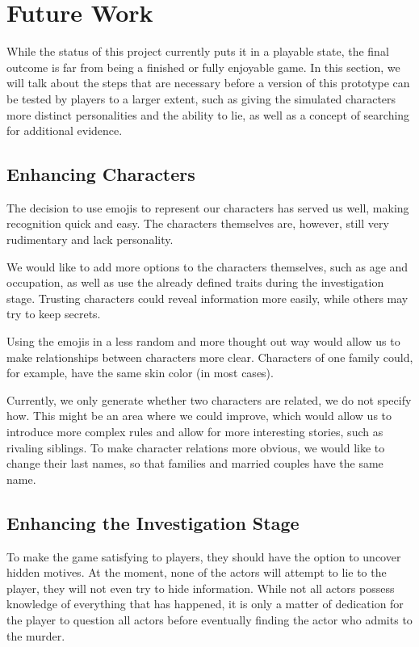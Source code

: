 \section{Future Work} \label{future_work}

While the status of this project currently puts it in a playable state, the final outcome is far from being a finished or fully enjoyable game.
In this section, we will talk about the steps that are necessary before a version of this prototype can be tested by players to a larger extent, such as giving the simulated characters more distinct personalities and the ability to lie, as well as a concept of searching for additional evidence.

\subsection{Enhancing Characters}

The decision to use emojis to represent our characters has served us well, making recognition quick and easy.
The characters themselves are, however, still very rudimentary and lack personality.

We would like to add more options to the characters themselves, such as age and occupation, as well as use the already defined traits during the investigation stage. Trusting characters could reveal information more easily, while others may try to keep secrets.

Using the emojis in a less random and more thought out way would allow us to make relationships between characters more clear. Characters of one family could, for example, have the same skin color (in most cases).

Currently, we only generate whether two characters are related, we do not specify how.
This might be an area where we could improve, which would allow us to introduce more complex rules and allow for more interesting stories, such as rivaling siblings. To make character relations more obvious, we would like to change their last names, so that families and married couples have the same name.

\subsection{Enhancing the Investigation Stage}
To make the game satisfying to players, they should have the option to uncover hidden motives.
At the moment, none of the actors will attempt to lie to the player, they will not even try to hide information.
While not all actors possess knowledge of everything that has happened, it is only a matter of dedication for the player to question all actors before eventually finding the actor who admits to the murder.

